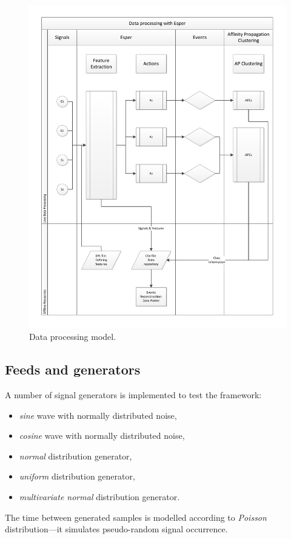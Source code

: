 \documentclass[11pt, letterpaper]{article}            %
\begin{document}
\begin{figure}[htbp]
    \centering
    \includegraphics[width=\textwidth]{./gfx/model.pdf}
  \caption{Data processing model.\label{fig:model}}
\end{figure}

\subsection{Feeds and generators\label{sec:generators}}
A number of signal generators is implemented to test the framework:
\begin{itemize}
    \item \emph{sine} wave with normally distributed noise,
    \item \emph{cosine} wave with normally distributed noise,
    \item \emph{normal} distribution generator,
    \item \emph{uniform} distribution generator,
    \item \emph{multivariate normal} distribution generator.
\end{itemize}
The time between generated samples is modelled according to \emph{Poisson} distribution---it simulates pseudo-random signal occurrence.\\
\end{document}
